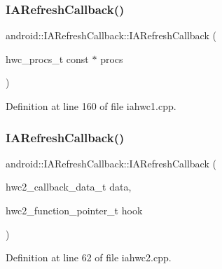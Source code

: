 \subsubsection{\texorpdfstring{I\+A\+Refresh\+Callback()}{IARefreshCallback()}\hspace{0.1cm}{\footnotesize\ttfamily [1/2]}}
{\footnotesize\ttfamily android\+::\+I\+A\+Refresh\+Callback\+::\+I\+A\+Refresh\+Callback (\begin{DoxyParamCaption}\item[{hwc\+\_\+procs\+\_\+t const $\ast$}]{procs }\end{DoxyParamCaption})\hspace{0.3cm}{\ttfamily [inline]}}



Definition at line 160 of file iahwc1.\+cpp.


\begin{DoxyCode}{0}
\end{DoxyCode}
\mbox{\label{classandroid_1_1IARefreshCallback_a21b1a0c87a4c494754c203adcb91fc34}} 
\subsubsection{\texorpdfstring{I\+A\+Refresh\+Callback()}{IARefreshCallback()}\hspace{0.1cm}{\footnotesize\ttfamily [2/2]}}
{\footnotesize\ttfamily android\+::\+I\+A\+Refresh\+Callback\+::\+I\+A\+Refresh\+Callback (\begin{DoxyParamCaption}\item[{hwc2\+\_\+callback\+\_\+data\+\_\+t}]{data,  }\item[{hwc2\+\_\+function\+\_\+pointer\+\_\+t}]{hook }\end{DoxyParamCaption})\hspace{0.3cm}{\ttfamily [inline]}}



Definition at line 62 of file iahwc2.\+cpp.


\begin{DoxyCode}{0}
\end{DoxyCode}


